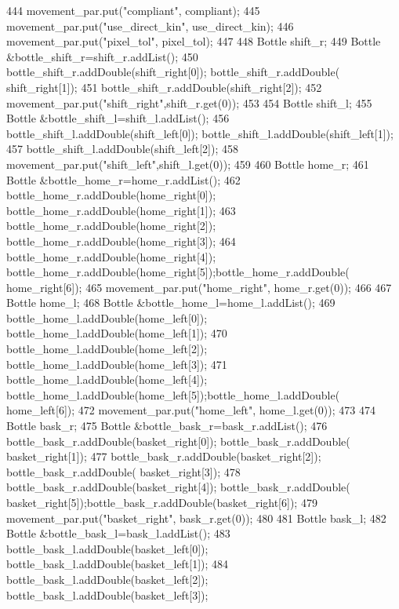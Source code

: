 \begin{DoxyCode}
444     movement_par.put(\textcolor{stringliteral}{"compliant"}, compliant);
445     movement_par.put(\textcolor{stringliteral}{"use\_direct\_kin"}, use_direct_kin);
446     movement_par.put(\textcolor{stringliteral}{"pixel\_tol"}, pixel_tol);
447 
448     Bottle shift\_r;
449     Bottle &bottle\_shift\_r=shift\_r.addList();
450     bottle\_shift\_r.addDouble(shift_right[0]); bottle\_shift\_r.addDouble(
      shift_right[1]);
451     bottle\_shift\_r.addDouble(shift_right[2]);
452     movement_par.put(\textcolor{stringliteral}{"shift\_right"},shift\_r.get(0));
453 
454     Bottle shift\_l;
455     Bottle &bottle\_shift\_l=shift\_l.addList();
456     bottle\_shift\_l.addDouble(shift_left[0]); bottle\_shift\_l.addDouble(shift_left[1]);
457     bottle\_shift\_l.addDouble(shift_left[2]);
458     movement_par.put(\textcolor{stringliteral}{"shift\_left"},shift\_l.get(0));
459 
460     Bottle home\_r;
461     Bottle &bottle\_home\_r=home\_r.addList();
462     bottle\_home\_r.addDouble(home_right[0]); bottle\_home\_r.addDouble(home_right[1]);
463     bottle\_home\_r.addDouble(home_right[2]); bottle\_home\_r.addDouble(home_right[3]);
464     bottle\_home\_r.addDouble(home_right[4]); bottle\_home\_r.addDouble(home_right[5]);bottle\_home\_r.addDouble(
      home_right[6]);
465     movement_par.put(\textcolor{stringliteral}{"home\_right"}, home\_r.get(0));
466 
467     Bottle home\_l;
468     Bottle &bottle\_home\_l=home\_l.addList();
469     bottle\_home\_l.addDouble(home_left[0]); bottle\_home\_l.addDouble(home_left[1]);
470     bottle\_home\_l.addDouble(home_left[2]); bottle\_home\_l.addDouble(home_left[3]);
471     bottle\_home\_l.addDouble(home_left[4]); bottle\_home\_l.addDouble(home_left[5]);bottle\_home\_l.addDouble(
      home_left[6]);
472     movement_par.put(\textcolor{stringliteral}{"home\_left"}, home\_l.get(0));
473 
474     Bottle bask\_r;
475     Bottle &bottle\_bask\_r=bask\_r.addList();
476     bottle\_bask\_r.addDouble(basket_right[0]); bottle\_bask\_r.addDouble(
      basket_right[1]);
477     bottle\_bask\_r.addDouble(basket_right[2]); bottle\_bask\_r.addDouble(
      basket_right[3]);
478     bottle\_bask\_r.addDouble(basket_right[4]); bottle\_bask\_r.addDouble(
      basket_right[5]);bottle\_bask\_r.addDouble(basket_right[6]);
479     movement_par.put(\textcolor{stringliteral}{"basket\_right"}, bask\_r.get(0));
480 
481     Bottle bask\_l;
482     Bottle &bottle\_bask\_l=bask\_l.addList();
483     bottle\_bask\_l.addDouble(basket_left[0]); bottle\_bask\_l.addDouble(basket_left[1]);
484     bottle\_bask\_l.addDouble(basket_left[2]); bottle\_bask\_l.addDouble(basket_left[3]);

\end{DoxyCode}
